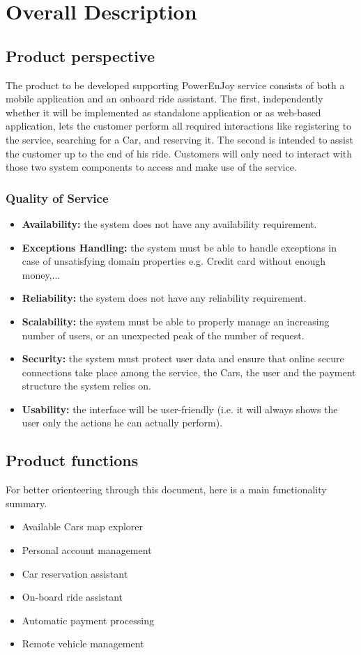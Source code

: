 \section{Overall Description}
\subsection{Product perspective}
The product to be developed supporting PowerEnJoy service consists of both a mobile application and an onboard ride assistant. The first, independently whether it will be implemented as standalone application or as web-based application, lets the customer perform all required interactions like registering to the service, searching for a Car, and reserving it. The second is intended to assist the customer up to the end of his ride. Customers will only need to interact with those two system components to access and make use of the service.
\subsubsection{Quality of Service}
\begin{itemize}
    \item \textbf{Availability:} the system does not have any availability requirement.
    \item \textbf{Exceptions Handling:} the system must be able to handle exceptions in case of unsatisfying domain properties e.g. Credit card without enough money,...
    \item \textbf{Reliability:} the system does not have any reliability requirement.
    \item \textbf{Scalability:} the system must be able to properly manage an increasing number of users, or an unexpected peak of the number of request.
    \item \textbf{Security:} the system must protect user data and ensure that online secure connections take place among the service, the Cars, the user and the payment structure the system relies on.
    \item \textbf{Usability:} the interface will be user-friendly (i.e. it will always shows the user only the actions he can actually perform).
\end{itemize}

\subsection{Product functions}
For better orienteering through this document, here is a main functionality summary.
\begin{itemize}
\item Available Cars map explorer
\item Personal account management
\item Car reservation assistant
\item On-board ride assistant
\item Automatic payment processing
\item Remote vehicle management
\end{itemize}

